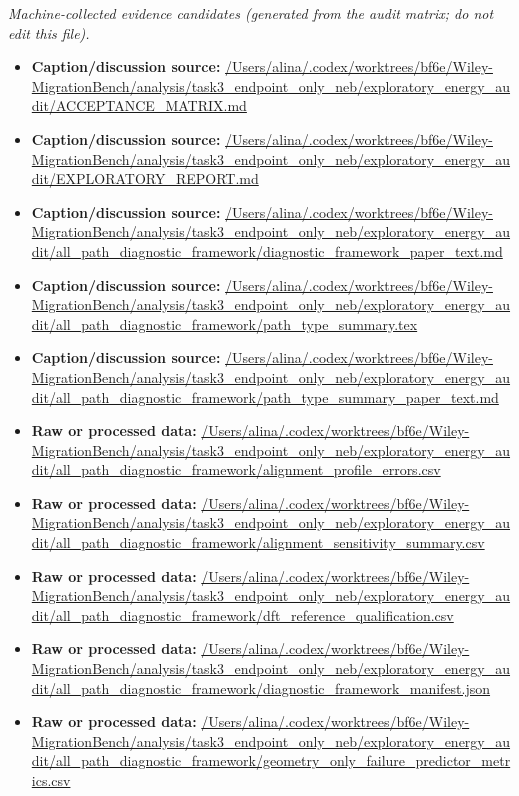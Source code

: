 \emph{Machine-collected evidence candidates (generated from the audit matrix; do not edit this file).}
\begin{itemize}[leftmargin=1.4em,noitemsep]
\item \textbf{Caption/discussion source:} \url{/Users/alina/.codex/worktrees/bf6e/Wiley-MigrationBench/analysis/task3_endpoint_only_neb/exploratory_energy_audit/ACCEPTANCE_MATRIX.md}
\item \textbf{Caption/discussion source:} \url{/Users/alina/.codex/worktrees/bf6e/Wiley-MigrationBench/analysis/task3_endpoint_only_neb/exploratory_energy_audit/EXPLORATORY_REPORT.md}
\item \textbf{Caption/discussion source:} \url{/Users/alina/.codex/worktrees/bf6e/Wiley-MigrationBench/analysis/task3_endpoint_only_neb/exploratory_energy_audit/all_path_diagnostic_framework/diagnostic_framework_paper_text.md}
\item \textbf{Caption/discussion source:} \url{/Users/alina/.codex/worktrees/bf6e/Wiley-MigrationBench/analysis/task3_endpoint_only_neb/exploratory_energy_audit/all_path_diagnostic_framework/path_type_summary.tex}
\item \textbf{Caption/discussion source:} \url{/Users/alina/.codex/worktrees/bf6e/Wiley-MigrationBench/analysis/task3_endpoint_only_neb/exploratory_energy_audit/all_path_diagnostic_framework/path_type_summary_paper_text.md}
\item \textbf{Raw or processed data:} \url{/Users/alina/.codex/worktrees/bf6e/Wiley-MigrationBench/analysis/task3_endpoint_only_neb/exploratory_energy_audit/all_path_diagnostic_framework/alignment_profile_errors.csv}
\item \textbf{Raw or processed data:} \url{/Users/alina/.codex/worktrees/bf6e/Wiley-MigrationBench/analysis/task3_endpoint_only_neb/exploratory_energy_audit/all_path_diagnostic_framework/alignment_sensitivity_summary.csv}
\item \textbf{Raw or processed data:} \url{/Users/alina/.codex/worktrees/bf6e/Wiley-MigrationBench/analysis/task3_endpoint_only_neb/exploratory_energy_audit/all_path_diagnostic_framework/dft_reference_qualification.csv}
\item \textbf{Raw or processed data:} \url{/Users/alina/.codex/worktrees/bf6e/Wiley-MigrationBench/analysis/task3_endpoint_only_neb/exploratory_energy_audit/all_path_diagnostic_framework/diagnostic_framework_manifest.json}
\item \textbf{Raw or processed data:} \url{/Users/alina/.codex/worktrees/bf6e/Wiley-MigrationBench/analysis/task3_endpoint_only_neb/exploratory_energy_audit/all_path_diagnostic_framework/geometry_only_failure_predictor_metrics.csv}

\end{itemize}
